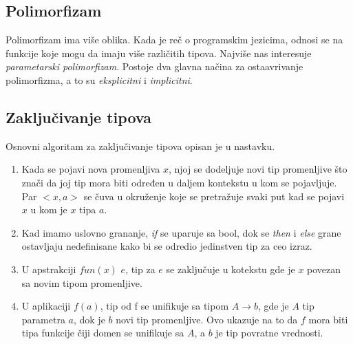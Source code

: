 \fi 


\subsection{Polimorfizam}

Polimorfizam ima više oblika. Kada je reč o programskim jezicima, odnosi se na funkcije koje mogu da imaju više različitih tipova. Najviše nas interesuje \textit{parametarski polimorfizam}. Postoje dva glavna načina za ostaavrivanje polimorfizma, a to su \textit{eksplicitni} i \textit{implicitni}. %


\subsection{Zaključivanje tipova}

Osnovni algoritam za zaključivanje tipova opisan je u nastavku.

\begin{enumerate}
	\item Kada se pojavi nova promenljiva $x$, njoj se dodeljuje novi tip promenljive što znači da joj tip mora biti određen u daljem kontekstu u kom se pojavljuje. Par $<x, a>$ se čuva u okruženje koje se pretražuje svaki put kad se pojavi $x$ u kom je $x$ tipa $a$.
	
	\item Kad imamo uslovno grananje, \textit{if} se uparuje sa bool, dok se \textit{then} i \textit{else} grane ostavljaju nedefinisane kako bi se odredio jedinstven tip za ceo izraz.
	
	\item U apstrakciji $fun(x)$ $e$, tip za $e$ se zaključuje u kotekstu gde je $x$ povezan sa novim tipom promenljive.
	
	\item U aplikaciji $f(a)$, tip od f se unifikuje sa tipom $A \longrightarrow b$, gde je $A$ tip parametra $a$, dok je $b$ novi tip promenljive. Ovo ukazuje na to da $f$ mora biti tipa funkcije čiji domen se unifikuje sa $A$, a $b$ je tip povratne vrednosti.
\end{enumerate}



